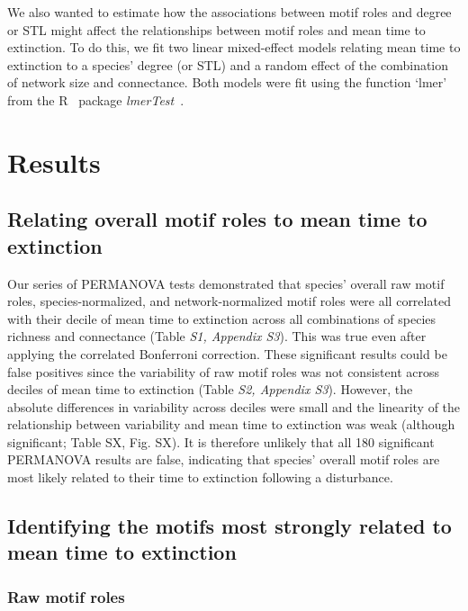 \documentclass[12pt]{article}
\begin{document}
\begin{spacing}{2.0}
            We also wanted to estimate how the associations between motif roles and degree or STL might affect the relationships between motif roles and mean time to extinction.
            To do this, we fit two linear mixed-effect models relating mean time to extinction to a species' degree (or STL) and a random effect of the combination of network size and connectance. 
            Both models were fit using the function `lmer' from the R~\citep{R} package \emph{lmerTest}~\citep{lmerTest}.


\section*{Results}
	
    \subsection*{Relating overall motif roles to mean time to extinction}
    
		Our series of PERMANOVA tests demonstrated that species' overall raw motif roles, species-normalized, and network-normalized motif roles were all correlated with their decile of mean time to extinction across all combinations of species richness and connectance (Table \emph{S1, Appendix S3}). 
		This was true even after applying the correlated Bonferroni correction.
		These significant results could be false positives since the variability of raw motif roles was not consistent across deciles of mean time to extinction (Table \emph{S2, Appendix S3}). 
		However, the absolute differences in variability across deciles were small and the linearity of the relationship between variability and mean time to extinction was weak (although significant; Table SX, Fig. SX).
		It is therefore unlikely that all 180 significant PERMANOVA results are false, indicating that species' overall motif roles are most likely related to their time to extinction following a disturbance.
    

	\subsection*{Identifying the motifs most strongly related to mean time to extinction}

        \subsubsection*{Raw motif roles}
        

\end{spacing}
\end{document}
